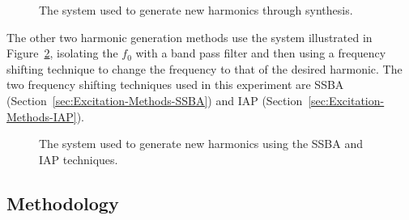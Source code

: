 		\begin{figure}[h!]
			\centering
			\caption{The system used to generate new harmonics through synthesis.}
			\label{fig:Synthesise}
		\end{figure}

		The other two harmonic generation methods use the system illustrated in Figure~\ref{fig:FilterAndShift},
		isolating the $f_{0}$ with a band pass filter and then using a frequency shifting technique to change the
		frequency to that of the desired harmonic. The two frequency shifting techniques used in this experiment
		are SSBA (Section~\ref{sec:Excitation-Methods-SSBA}) and IAP (Section~\ref{sec:Excitation-Methods-IAP}).

		\begin{figure}[h!]
			\centering
			\caption{The system used to generate new harmonics using the SSBA and IAP techniques.}
			\label{fig:FilterAndShift}
		\end{figure}

	\subsection{Methodology}
	\label{sec:PerceptualExperiments-Reconstruction-Methodology}
